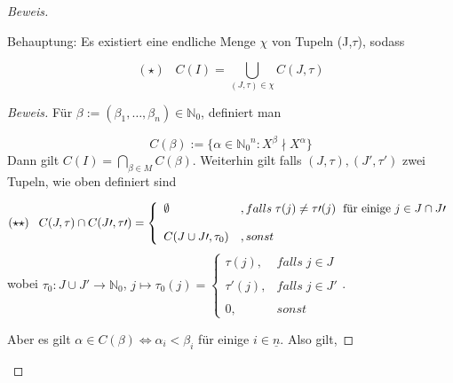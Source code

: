\documentclass{article}
\newcommand*{\indx}[2]{{#1}_{#2}}
\newcommand*{\potx}[2]{{#1}^{#2}}
\newcommand*{\N}{\mathbb{N}_0}
\begin{document}
\begin{proof}[Beweis]
\begin{compactenum}
Behauptung: Es existiert eine endliche Menge $\chi$ von Tupeln (J,$\tau$), sodass 

\begin{displaymath}
(\star)\;\;\;   C(I)=\bigcup\limits_{(J,\tau)\in \chi} C(J,\tau)  
 \end{displaymath}

\begin{proof}[Beweis]
	Für $\beta:=(\indx{\beta}{1},\ldots,\indx{\beta}{n}) \in \N$, definiert man 
	
	\begin{displaymath}
	C(\beta):=\{\alpha\in \potx{\N}{n}: \potx{X}{\beta}\nmid\potx{X}{\alpha}\}
	\end{displaymath}
	Dann gilt $C(I)=\bigcap\limits_{\beta\in M}C(\beta)$. 
	Weiterhin gilt falls $(J,\tau),(J\prime,\tau\prime)$ zwei Tupeln, wie oben definiert sind
	
	\begin{displaymath}
	(\star \star)\;\;\;   C(J,\tau)\cap C(J\prime,\tau\prime)=\left\{\begin{array}{ll} \emptyset & ,falls  \;\tau(j)\neq\tau\prime(j)\; \textnormal{ für einige } j\in J\cap J\prime \\
	\\
	C(J\cup J\prime, \tau_0) & ,sonst \end{array}\right.
	\end{displaymath} 
	wobei $\indx{\tau}{0}:J\cup J\prime \longrightarrow \N$, $ j\mapsto \tau_{0}(j)=\left\{\begin{array}{ll} \tau(j), & falls\;  j \in J \\
	\\
	\tau\prime(j), & falls\;  j \in J\prime \\
	\\
	0, & sonst \end{array}\right.$.
	
%	
	Aber es gilt $\alpha \in C(\beta)\Leftrightarrow \indx{\alpha}{i}<\indx{\beta}{i}$ für einige $i\in\underline{n}$. Also gilt,
 	


\end{proof}
\end{compactenum}
\end{proof}
\end{document}
